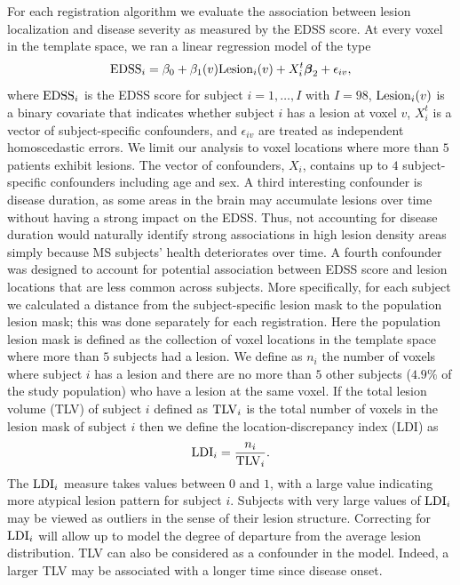 \documentclass[10pt]{article}
\newcommand{\bbeta}{\mbox{\boldmath $\beta$}}
\begin{document}
For each registration algorithm we evaluate the association
between lesion localization and disease severity as measured by the
EDSS score. At every voxel in the template space, we ran a linear
regression model of the type
\begin{equation}\label{eq:edss_regression}
{\rm EDSS}_i=\beta_0+\beta_1(v) {\rm Lesion}_i(v)+X^t_i \bbeta_2 + \epsilon_{iv}, 
\end{equation}
where ${\rm EDSS}_i$ is the EDSS score for subject
$i=1,\ldots,I$ with $I=98$, ${\rm Lesion}_i(v)$ is a binary covariate that indicates
whether subject $i$ has a lesion at voxel $v$, $X^t_i$ is a vector
of subject-specific confounders, and $\epsilon_{iv}$ are treated as
independent homoscedastic errors. We limit our analysis to voxel
locations where more than $5$ patients exhibit lesions. The vector of
confounders, $X_i$, contains up to $4$ subject-specific confounders
including age and sex. A third interesting confounder is disease
duration, as some areas in the brain may accumulate lesions over
time without having a strong impact on the EDSS. Thus, not
accounting for disease duration would naturally identify strong
associations in high lesion density areas simply because MS
subjects' health deteriorates over time. A fourth confounder was
designed to account for potential association between EDSS score and lesion locations that are less common across subjects. More specifically, for each subject we
calculated a distance from the subject-specific lesion mask to the
population lesion mask; this was done separately for each
registration. Here the population lesion mask is defined as the
collection of voxel locations in the template space where more than
$5$ subjects had a lesion. We define as $n_i$ the number of voxels
where subject $i$ has a lesion and there are no more than $5$ other
subjects ($4.9\%$ of the study population) who have a lesion at the same voxel. If the total lesion
volume (TLV) of  subject $i$ defined as ${\rm TLV}_i$ is the total
number of voxels in the lesion mask of subject $i$ then we define
the location-discrepancy index (LDI) as
\begin{equation}\nonumber
{\rm LDI}_{i} = \frac{n_i}{{\rm TLV}_i}.
\end{equation}
The ${\rm LDI}_{i}$ measure takes values between $0$ and $1$, with a
large value indicating more atypical lesion pattern for subject $i$.
Subjects with very large values of ${\rm LDI}_{i}$ may be viewed as
outliers in the sense of their lesion structure. Correcting for
${\rm LDI}_{i}$ will allow up to model the degree of departure
from the average lesion distribution. TLV can also be considered as
a confounder in the model. Indeed, a larger TLV may be associated
with a longer time since disease onset.
\end{document}
